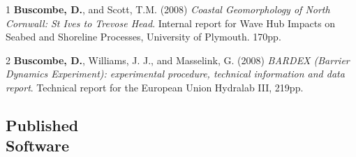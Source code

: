 \documentclass[margin,line]{resume}
\begin{document}
\begin{resume}
\begin{footnotesize}
\begin{list1}
	\item[1] {\bf Buscombe, D.}, and Scott, T.M. (2008) {\sl Coastal Geomorphology of North Cornwall: St Ives to Trevose Head}. Internal report for Wave Hub Impacts on Seabed and Shoreline Processes, University of Plymouth. 170pp.\\
	\item[2] {\bf Buscombe, D.}, Williams, J. J., and Masselink, G. (2008) {\sl BARDEX (Barrier Dynamics Experiment): experimental procedure, technical information and data report}. Technical report for the European Union Hydralab III, 219pp. 

	\end{list1}
        \end{footnotesize}

	\subsection{\mysidestyle Published \\ Software}

        \begin{footnotesize}
	\begin{list1}
	 

\end{list1}
\end{footnotesize}
\end{resume}
\end{document}
